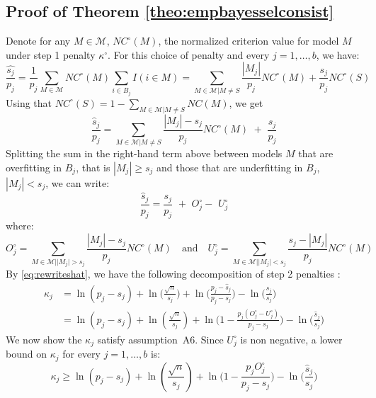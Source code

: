 \documentclass[aos]{imsart}
\theoremstyle{plain}
\newcommand{\M}{\mathcal{M}}
\begin{document}
\subsection{Proof of Theorem \ref{theo:empbayesselconsist}}
Denote for any $M\in\M$, $NC^{\circ}(M)$, the normalized criterion value for model $M$ under step 1 penalty $\kappa^{\circ}$. For this choice of penalty and every $j=1,\ldots,b$, we have:
\begin{equation*}
    \frac{\widehat{s_j}}{p_j}
   = \frac{1}{p_j}\sum_{M \in \M}NC^{\circ}(M)\sum_{i \in B_j}I(i\in M) =\sum_{M \in \M | M \neq S}\frac{|M_j|}{p_j}NC^{\circ}(M) +\frac{s_j}{p_j}NC^{\circ}(S) 
\end{equation*}
Using that $NC^{\circ}(S)=1-\sum_{M \in \M | M \neq S}NC(M)$, we get
\begin{equation*}
   \frac{\widehat{s}_j}{p_j}
   =\sum_{M \in \M | M \neq S}\frac{|M_j|-s_j}{p_j}NC^{\circ}(M) \,\,+\,\, \frac{s_j}{p_j}
\end{equation*}
Splitting the sum in the right-hand term above between models $M$ that are overfitting in $B_j$, that is $|M_j|\geq s_j$ and those that are underfitting in $B_j$, $|M_j|<s_j$, we can write:
\begin{equation}\label{eq:rewriteshat}
  \frac{\widehat{s}_j}{p_j}  = \frac{s_j}{p_j}\,\,+\,\, O_j^{\circ}-\,\,U_j^{\circ}  
\end{equation}
where:
$$
    O_j^{\circ} = \sum_{M \in \M | |M_j| > s_j}\frac{|M_j|-s_j}{p_j}NC^{\circ}(M)\quad\text{and}\quad
    U_j^{\circ} = \sum_{M \in \M | |M_j| < s_j}\frac{s_j-|M_j|}{p_j}NC^{\circ}(M)
$$
By \eqref{eq:rewriteshat}, we have the following decomposition of step 2 penalties :
\begin{align}\label{eq:decompstep2pen}
    \kappa_j
    &= \ln(p_j-s_j) + \ln\Big(\frac{\sqrt{n}}{s_j}\Big) + \ln\Big(\frac{p_j-\widehat{s}_j}{p_j-s_j}\Big) - \ln\Big(\frac{\widehat{s}_j}{s_j}\Big) \nonumber\\
    &= \ln(p_j-s_j)+\ln(\frac{\sqrt{n}}{s_j})+\ln\Big(1-\frac{p_j(O^{\circ}_j-U^{\circ}_j)}{p_j-s_j}\Big)-\ln\Big(\frac{\widehat{s}_j}{s_j}\Big)
\end{align}
We now show the $\kappa_j$ satisfy assumption~A6. Since $U_j^{\circ}$ is non negative, a lower bound on $\kappa_j$ for every $j=1,\ldots,b$ is:
\begin{equation*}
    \kappa_j
    \geq  \ln(p_j-s_j)+\ln(\frac{\sqrt{n}}{s_j})+\ln\Big(1-\frac{p_j O^{\circ}_j}{p_j-s_j}\Big)-\ln\Big(\frac{\widehat{s}_j}{s_j}\Big)
\end{equation*}
\end{document}
